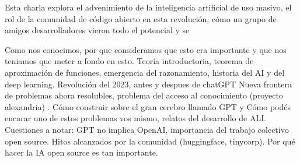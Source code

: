 Esta charla explora el advenimiento de la inteligencia artificial de uso masivo, el rol de la comunidad de 
código abierto en esta revolución, cómo un grupo de amigos desarrolladores vieron todo el potencial  y se





Como nos conocimos, por que consideramos que esto era importante y que nos teniamos que meter a fondo en esto.
Teoría introductoria, teorema de aproximación de funciones, emergencia del razonamiento, historia del AI y del deep learning.
Revolución del 2023, antes y despues de chatGPT
Nueva frontera de problemas ahora resolubles, problema del acceso al conocimiento (proyecto alexandria) .
Cómo construir sobre el gran cerebro llamado GPT y Cómo podés encarar uno de estos problemas vos mismo, relatos del desarrollo de ALI.
Cuestiones a notar: GPT no implica OpenAI, importancia del trabajo colectivo open source. Hitos alcanzados por la comunidad (huggingface, tinycorp). Por qué hacer la IA open source es tan importante.





